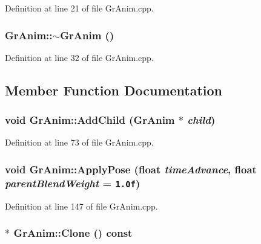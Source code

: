 Definition at line 21 of file GrAnim.cpp.\hypertarget{class_gr_anim_c2e84ed21513c92654d033c015003260}{
\subsubsection[{$\sim$GrAnim}]{\setlength{\rightskip}{0pt plus 5cm}GrAnim::$\sim$GrAnim ()}}
\label{class_gr_anim_c2e84ed21513c92654d033c015003260}




Definition at line 32 of file GrAnim.cpp.

\subsection{Member Function Documentation}
\hypertarget{class_gr_anim_83ac6be64b6a8ea93ad373326c9ab2ee}{
\subsubsection[{AddChild}]{\setlength{\rightskip}{0pt plus 5cm}void GrAnim::AddChild ({\bf GrAnim} $\ast$ {\em child})}}
\label{class_gr_anim_83ac6be64b6a8ea93ad373326c9ab2ee}




Definition at line 73 of file GrAnim.cpp.\hypertarget{class_gr_anim_2ba496a35bd9ffef0eddd31b1f540d89}{
\subsubsection[{ApplyPose}]{\setlength{\rightskip}{0pt plus 5cm}void GrAnim::ApplyPose (float {\em timeAdvance}, \/  float {\em parentBlendWeight} = {\tt 1.0f})}}
\label{class_gr_anim_2ba496a35bd9ffef0eddd31b1f540d89}




Definition at line 147 of file GrAnim.cpp.\hypertarget{class_gr_anim_2964f4d1c2a3b51ff301b03590d26bac}{
\subsubsection[{Clone}]{ $\ast$ GrAnim::Clone () const}}
\label{class_gr_anim_2964f4d1c2a3b51ff301b03590d26bac}




